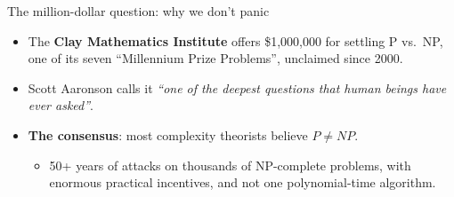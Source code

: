 \ifdefined\PRESENTATION\else\PassOptionsToClass{handout}{beamer}\fi\documentclass[aspectratio=169, lualatex]{beamer}
\begin{document}
\begin{frame}{The million-dollar question: why we don't panic}
	\begin{itemize}[<+->]
		\item The \textbf{Clay Mathematics Institute} offers \$1,000,000 for settling P vs.\ NP, one of its seven ``Millennium Prize Problems'', unclaimed since 2000.
		\item Scott Aaronson calls it \textit{``one of the deepest questions that human beings have ever asked''}.
		\item \textbf{The consensus}: most complexity theorists believe $P \neq NP$.
		      \begin{itemize}
			      \item 50+ years of attacks on thousands of NP-complete problems, with enormous practical incentives, and not one polynomial-time algorithm.
		      \end{itemize}
	\end{itemize}
\end{frame}
\end{document}
